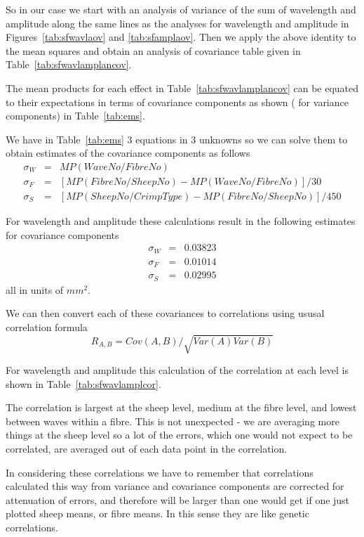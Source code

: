 \documentclass[titlepage,10pt]{article}  %
\begin{document}
So in our case we start with an analysis of variance of the sum of wavelength and amplitude along the same lines as the analyses for wavelength and amplitude in Figures~\ref{tab:sfwavlaov} and \ref{tab:sfamplaov}. Then we apply the above identity to the mean squares and obtain an analysis of covariance table given in Table~\ref{tab:sfwavlamplancov}.



The mean products for each effect in Table~\ref{tab:sfwavlamplancov} can be equated to their expectations in terms of covariance components as shown ( for variance components) in Table~\ref{tab:ems}.

We have in Table~\ref{tab:ems} 3 equations in 3 unknowns so we can solve them to obtain estimates of the covariance components as follows
\begin{eqnarray*}
\sigma_{W} & = & MP(WaveNo/FibreNo) \\
\sigma_{F} & = & [MP(FibreNo/SheepNo) - MP(WaveNo/FibreNo)]/30 \\
\sigma_{S} & = & [MP(SheepNo/CrimpType) - MP(FibreNo/SheepNo)]/450
\end{eqnarray*}

For wavelength and amplitude these calculations result in the following estimates for covariance components
\begin{eqnarray*}
\sigma_{W} & = & 0.03823 \\
\sigma_{F} & = & 0.01014 \\
\sigma_{S} & = & 0.02995
\end{eqnarray*}
all in units of $mm^{2}$.

We can then convert each of these covariances to correlations using ususal correlation formula
\begin{displaymath}
R_{A,B} = Cov(A,B)/\sqrt{Var(A) Var(B)}
\end{displaymath}

For wavelength and amplitude this calculation of the correlation at each level is shown in Table~\ref{tab:sfwavlamplcor}.

The correlation is largest at the sheep level, medium at the fibre level, and lowest between waves within a fibre. This is not unexpected - we are averaging more things at the sheep level so a lot of the errors, which one would not expect to be correlated, are averaged out of each data point in the correlation.

In considering these correlations we have to remember that correlations calculated this way from variance and covariance components are corrected for attenuation of errors, and therefore will be larger than one would get if one just plotted sheep means, or fibre means. In this sense they are like genetic correlations. 
\end{document}
